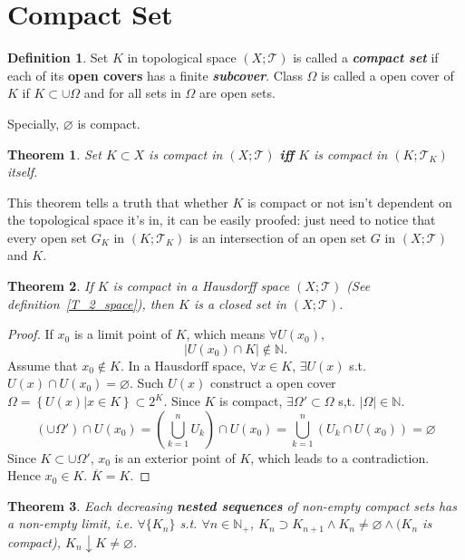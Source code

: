 \documentclass[openany]{book}
\newcommand*{\indexbf}[1]{\emph{\textbf{#1}}\index{#1}} %
\theoremstyle{plain}
\newtheorem{theorem}{Theorem}[section] %
\theoremstyle{definition}
\newtheorem{definition}{Definition}[section] %
\newcommand{\emphbf}[1]{\emph{\textbf{#1}}}
\begin{document}
\section{Compact Set}
\begin{definition}\label{compact}
Set $K$ in topological space $(X;\mathscr{T})$ is called a \indexbf{compact set} if each of its \textbf{open covers} has a finite \indexbf{subcover}. Class $\Omega$ is called a open cover of $K$ if $K\subset \cup{\Omega}$ and for all sets in $\Omega$ are open sets.
\end{definition}
Specially, $\varnothing$ is compact.
\begin{theorem}\label{selfcompact}
	Set $K\subset X$ is compact in $(X;\mathscr{T})$ \emphbf{iff} $K$ is compact in $(K;\mathscr{T}_K)$ itself. 
\end{theorem}
This theorem tells a truth that whether $K$ is compact or not isn't dependent on the topological space it's in, it can be easily proofed: just need to notice that every open set $G_K$ in $(K;\mathscr{T}_K)$ is an intersection of an open set $G$ in $(X;\mathscr{T})$ and $K$. 
\begin{theorem}\label{compact_Hausdorff_closed}
	If $K$ is compact in a Hausdorff space $(X;\mathscr{T})$ (See definition~\ref{T_2_space}), then $K$ is a closed set in $(X;\mathscr{T})$.
\end{theorem}
\begin{proof}
	If $x_0$ is a limit point of $K$, which means $\forall U(x_0)$, 
\[
	\left|U(x_0)\cap K\right|\notin \mathbb{N}.
\]
Assume that $x_0\notin K$. In a Hausdorff space, $\forall x\in K$, $\exists U(x)$ s.t. $U(x)\cap U(x_0)=\varnothing$. Such $U(x)$ construct a open cover $\Omega=\left\{U(x)|x\in K\right\}\subset 2^K$. Since $K$ is compact, $\exists \Omega'\subset\Omega$ s,t. $\left|\Omega\right|\in\mathbb{N}$. 
\[
	\left(\cup\Omega'\right)
	\cap U(x_0)
	=
	\left(\bigcup_{k=1}^n{U_k}\right)
	\cap U(x_0)
	=
	\bigcup_{k=1}^n\left(
		U_k\cap U(x_0)
	\right)
	=
	\varnothing
\]
Since $K\subset \cup\Omega'$, $x_0$ is an exterior point of $K$, which leads to a contradiction. Hence $x_0\in K$. $\overline{K}=K$.
\end{proof}
\begin{theorem}\label{nested_compact}
Each decreasing \emph{\textbf{nested sequences}} of non-empty compact sets has a non-empty limit, i.e. $\forall\{K_n\}$ s.t. $\forall n\in\mathbb{N}_+$, $K_n\supset K_{n+1}\wedge K_n\neq\varnothing\wedge (K_n$ is compact), $K_n\downarrow K\neq \varnothing$.
\end{theorem}
\end{document}
